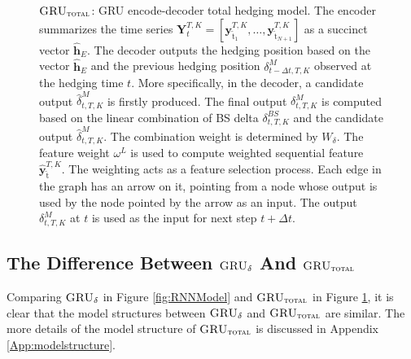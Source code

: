 \documentclass[letterpaper,12pt,titlepage,oneside,final]{book}
\numberwithin{equation}{section}
\theoremstyle{definition}
\newcommand{\model}{\textsc{GRU}_\delta}
\newcommand{\modelT}{\textsc{GRU}_{\textsc{total}}}
\newcommand{\vy}{\mathbf{y}}
\newcommand{\DT}{\Delta t}
\newcommand{\nt}{\breve{\text{t}}}
\begin{document}
\begin{figure}[htp!]
{
	}
	\caption{$\modelT$: GRU encode-decoder total hedging model. The encoder summarizes the time series $\mathbf{Y}_{t}^{T,K}=\left[\vy^{T,K}_{\nt_{1}},\dots,\vy^{T,K}_{\nt_{N+1}}\right]$ as a succinct  vector $\widehat{\mathbf{h}}_E$. The decoder outputs the hedging position based on the vector $\widehat{\mathbf{h}}_E$ and the previous hedging position $\delta^M_{t-\Delta t,T,K}$ observed at the hedging time $t$. More specifically, in the decoder, a candidate output $\widehat{\delta}^M_{t,T,K}$ is firstly produced. The final output $\delta^M_{t,T,K}$ is computed based on the linear combination of BS delta $\delta^{BS}_{t,T,K}$ and the candidate output  $\widehat{\delta}^M_{t,T,K}$. The combination weight is determined by  $W_{\delta}$. The feature weight $\omega^L$ is used to compute weighted sequential feature $\widehat{\vy}^{T,K}_{\nt}$. The weighting acts as a feature selection process.
		Each edge in the graph has an arrow on it, pointing from a node whose output is used by the node pointed by the arrow as an input. The output $\delta^M_{t,T,K}$ at $t$ is used as the input for next step $t+\DT$.}
	\label{fig:RNNModelTotal}
\end{figure}
\subsection{The Difference Between  $\model$ And $\modelT$}
Comparing  $\model$  in Figure \ref{fig:RNNModel} and  $\modelT$  in Figure \ref{fig:RNNModelTotal}, it is clear that the model structures between $\model$ and $\modelT$ are similar. The more details of the  model structure of $\modelT$ is discussed in Appendix \ref{App:modelstructure}.
\end{document}
